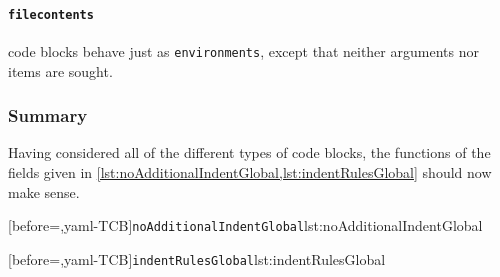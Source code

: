 	\paragraph{\texttt{filecontents}} code blocks behave just as \texttt{environments}, except that neither arguments nor items are sought.

\subsubsection{Summary}
	Having considered all of the different types of code blocks, the functions of the fields given in
	\cref{lst:noAdditionalIndentGlobal,lst:indentRulesGlobal} should now make sense.

	\begin{widepage}
		\begin{minipage}{.47\linewidth}
			[before=\centering,yaml-TCB]{\texttt{noAdditionalIndentGlobal}}{lst:noAdditionalIndentGlobal}
		\end{minipage}%
		\hfill
		\begin{minipage}{.47\linewidth}
			[before=\centering,yaml-TCB]{\texttt{indentRulesGlobal}}{lst:indentRulesGlobal}
		\end{minipage}%
	\end{widepage}
